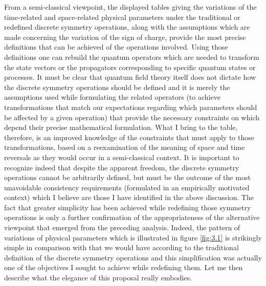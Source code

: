 \documentclass[notitlepage,12pt]{report}
\begin{document}
From a semi-classical viewpoint, the displayed tables giving the variations of the time-related and space-related physical parameters under the traditional or redefined discrete symmetry operations, along with the assumptions which are made concerning the variation of the sign of charge, provide the most precise definitions that can be achieved of the operations involved. Using those definitions one can rebuild the quantum operators which are needed to transform the state vectors or the propagators corresponding to specific quantum states or processes. It must be clear that quantum field theory itself does not dictate how the discrete symmetry operations should be defined and it is merely the assumptions used while formulating the related operators (to achieve transformations that match our expectations regarding which parameters should be affected by a given operation) that provide the necessary constraints on which depend their precise mathematical formulation. What I bring to the table, therefore, is an improved knowledge of the constraints that must apply to those transformations, based on a reexamination of the meaning of space and time reversals as they would occur in a semi-classical context. It is important to recognize indeed that despite the apparent freedom, the discrete symmetry operations cannot be arbitrarily defined, but must be the outcome of the most unavoidable consistency requirements (formulated in an empirically motivated context) which I believe are those I have identified in the above discussion. The fact that greater simplicity has been achieved while redefining those symmetry operations is only a further confirmation of the appropriateness of the alternative viewpoint that emerged from the preceding analysis. Indeed, the pattern of variations of physical parameters which is illustrated in figure \ref{fig:3.1} is strikingly simple in comparison with that we would have according to the traditional definition of the discrete symmetry operations and this simplification was actually one of the objectives I sought to achieve while redefining them. Let me then describe what the elegance of this proposal really embodies.
\end{document}
